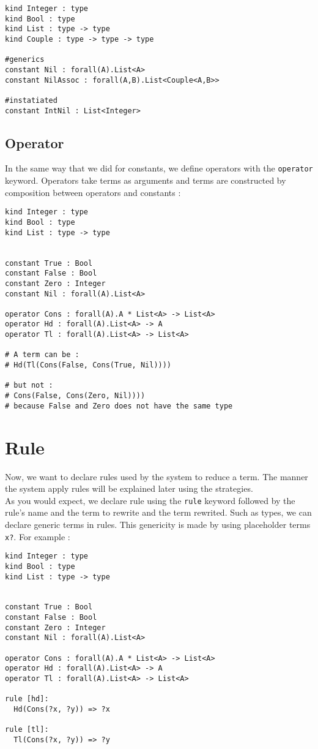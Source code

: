 \documentclass[12pt,a4paper]{article}
\begin{document}
\begin{verbatim}
kind Integer : type
kind Bool : type
kind List : type -> type
kind Couple : type -> type -> type

#generics
constant Nil : forall(A).List<A>
constant NilAssoc : forall(A,B).List<Couple<A,B>>

#instatiated
constant IntNil : List<Integer>
\end{verbatim}

\subsection{Operator}
In the same way that we did for constants, we define operators with the
\verb?operator? keyword. Operators take terms as arguments and terms
are constructed by composition between operators and constants :

\begin{verbatim}
kind Integer : type
kind Bool : type
kind List : type -> type


constant True : Bool
constant False : Bool
constant Zero : Integer
constant Nil : forall(A).List<A>

operator Cons : forall(A).A * List<A> -> List<A>
operator Hd : forall(A).List<A> -> A
operator Tl : forall(A).List<A> -> List<A>

# A term can be :
# Hd(Tl(Cons(False, Cons(True, Nil))))

# but not :
# Cons(False, Cons(Zero, Nil))))
# because False and Zero does not have the same type
\end{verbatim}

\section{Rule}
Now, we want to declare rules used by the system to reduce a term.
The manner the system apply rules will be explained later using the
strategies.\\
As you would expect, we declare rule using the \verb?rule? keyword
followed by the rule's name and the term to rewrite and the term
rewrited. Such as types, we can declare generic terms in rules. This
genericity is made by using placeholder terms \verb!x?!. For example :
\begin{verbatim}
kind Integer : type
kind Bool : type
kind List : type -> type


constant True : Bool
constant False : Bool
constant Zero : Integer
constant Nil : forall(A).List<A>

operator Cons : forall(A).A * List<A> -> List<A>
operator Hd : forall(A).List<A> -> A
operator Tl : forall(A).List<A> -> List<A>

rule [hd]:
  Hd(Cons(?x, ?y)) => ?x

rule [tl]:
  Tl(Cons(?x, ?y)) => ?y
\end{verbatim}
\end{document}
